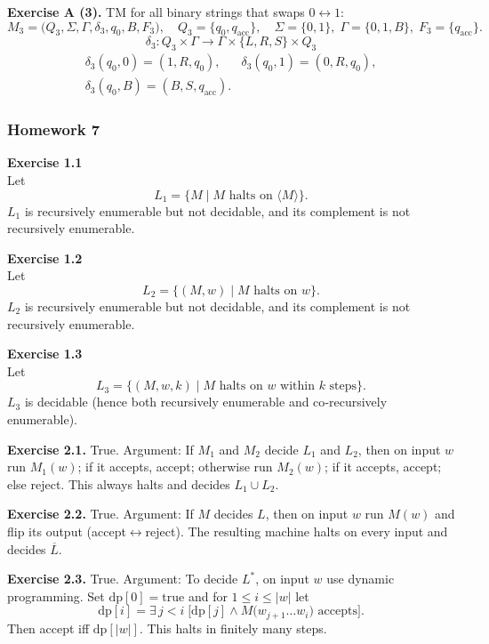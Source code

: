 \documentclass{article}
\theoremstyle{theorem}
\theoremstyle{definition}
\theoremstyle{remark}
\begin{document}
\medskip
\noindent\textbf{Exercise A (3).} TM for all binary strings that swaps \(0\leftrightarrow1\):
\[
M_3 = \bigl(Q_3,\Sigma,\Gamma,\delta_3,q_0,B,F_3\bigr),
\quad
Q_3=\{q_0,q_{\mathrm{acc}}\},
\quad
\Sigma=\{0,1\},\;\Gamma=\{0,1,B\},\;
F_3=\{q_{\mathrm{acc}}\}.
\]
\[
\delta_3\colon Q_3\times\Gamma\to\Gamma\times\{L,R,S\}\times Q_3
\]
\[
\begin{array}{rl}
\delta_3(q_0,0)=(1,R,q_0), & \delta_3(q_0,1)=(0,R,q_0),\\
\delta_3(q_0,B)=(B,S,q_{\mathrm{acc}}).
\end{array}
\]

\subsubsection*{Homework 7}

\textbf{Exercise 1.1}\\
Let 
\[
L_1 = \{M \mid M\text{ halts on }\langle M\rangle\}.
\]
\(L_1\) is recursively enumerable but not decidable, and its complement is not recursively enumerable.

\textbf{Exercise 1.2}\\
Let 
\[
L_2 = \{(M,w) \mid M\text{ halts on }w\}.
\]
\(L_2\) is recursively enumerable but not decidable, and its complement is not recursively enumerable.

\textbf{Exercise 1.3}\\
Let 
\[
L_3 = \{(M,w,k)\mid M\text{ halts on }w\text{ within }k\text{ steps}\}.
\]
\(L_3\) is decidable (hence both recursively enumerable and co‑recursively enumerable).

\textbf{Exercise 2.1.} True. Argument: If \(M_1\) and \(M_2\) decide \(L_1\) and \(L_2\), then on input \(w\) run \(M_1(w)\); if it accepts, accept; otherwise run \(M_2(w)\); if it accepts, accept; else reject. This always halts and decides \(L_1\cup L_2\).

\textbf{Exercise 2.2.} True. Argument: If \(M\) decides \(L\), then on input \(w\) run \(M(w)\) and flip its output (accept\(\leftrightarrow\)reject). The resulting machine halts on every input and decides \(\overline L\).

\textbf{Exercise 2.3.} True. Argument: To decide \(L^*\), on input \(w\) use dynamic programming. Set \(\mathrm{dp}[0]=\text{true}\) and for \(1\le i\le|w|\) let
\[
\mathrm{dp}[i] = \exists\,j<i\;\bigl[\mathrm{dp}[j]\land M\bigl(w_{j+1}\dots w_i\bigr)\text{ accepts}\bigr].
\]
Then accept iff \(\mathrm{dp}[|w|]\). This halts in finitely many steps.
\end{document}
